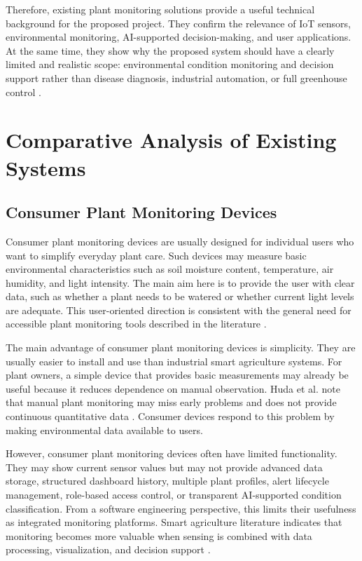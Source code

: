 Therefore, existing plant monitoring solutions provide a useful technical background for the proposed project. They confirm the relevance of IoT sensors, environmental monitoring, AI-supported decision-making, and user applications. At the same time, they show why the proposed system should have a clearly limited and realistic scope: environmental condition monitoring and decision support rather than disease diagnosis, industrial automation, or full greenhouse control \cite{huda2024iot,gaitan2025integrating,raju2022hydroponics,siddiquee2022algorithms,ali2024automated}.
\section{Comparative Analysis of Existing Systems}

\subsection{Consumer Plant Monitoring Devices}

Consumer plant monitoring devices are usually designed for individual users who want to simplify everyday plant care. Such devices may measure basic environmental characteristics such as soil moisture content, temperature, air humidity, and light intensity. The main aim here is to provide the user with clear data, such as whether a plant needs to be watered or whether current light levels are adequate. This user-oriented direction is consistent with the general need for accessible plant monitoring tools described in the literature \cite{huda2024iot}.

The main advantage of consumer plant monitoring devices is simplicity. They are usually easier to install and use than industrial smart agriculture systems. For plant owners, a simple device that provides basic measurements may already be useful because it reduces dependence on manual observation. Huda et al. note that manual plant monitoring may miss early problems and does not provide continuous quantitative data \cite{huda2024iot}. Consumer devices respond to this problem by making environmental data available to users.

However, consumer plant monitoring devices often have limited functionality. They may show current sensor values but may not provide advanced data storage, structured dashboard history, multiple plant profiles, alert lifecycle management, role-based access control, or transparent AI-supported condition classification. From a software engineering perspective, this limits their usefulness as integrated monitoring platforms. Smart agriculture literature indicates that monitoring becomes more valuable when sensing is combined with data processing, visualization, and decision support \cite{ahmed2024smart,mowla2023iot}.

